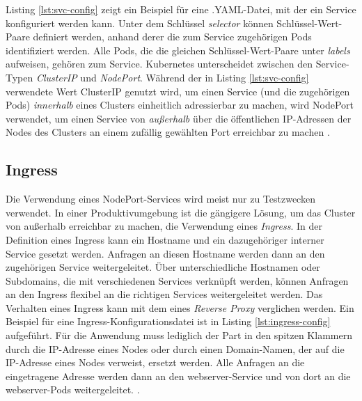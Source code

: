 \documentclass[11pt,a4paper]{article}
\begin{document}
Listing \ref{lst:svc-config} zeigt ein Beispiel für eine .YAML-Datei,
mit der ein Service konfiguriert werden kann.
Unter dem Schlüssel \emph{selector} können Schlüssel-Wert-Paare definiert werden,
anhand derer die zum Service zugehörigen Pods identifiziert werden. Alle Pods, die
die gleichen Schlüssel-Wert-Paare unter \emph{labels} aufweisen, gehören zum Service.
Kubernetes unterscheidet zwischen den Service-Typen \emph{ClusterIP} und \emph{NodePort}.
Während der in Listing \ref{lst:svc-config} verwendete Wert ClusterIP genutzt wird, um einen Service
(und die zugehörigen Pods) \emph{innerhalb} eines Clusters
einheitlich adressierbar zu machen, wird NodePort verwendet, um einen Service von \emph{außerhalb}
über die öffentlichen IP-Adressen der Nodes des Clusters an einem zufällig gewählten Port erreichbar zu machen \cite{Schmeling_Dargatz_2022}.


\subsection{Ingress}
\label{sec:Ingress}
Die Verwendung eines NodePort-Services wird meist nur zu Testzwecken verwendet. In einer Produktivumgebung
ist die gängigere Lösung, um das Cluster von außerhalb erreichbar zu machen, die Verwendung eines \emph{Ingress}.
In der Definition eines Ingress kann ein Hostname und ein dazugehöriger interner Service gesetzt werden.
Anfragen an diesen Hostname werden dann an den zugehörigen Service weitergeleitet. Über unterschiedliche Hostnamen
oder Subdomains, die mit verschiedenen Services verknüpft werden, können Anfragen an den Ingress flexibel
an die richtigen Services weitergeleitet werden. Das Verhalten eines Ingress kann mit dem eines \emph{Reverse Proxy} \cite{nginx}
verglichen werden.
Ein Beispiel für eine Ingress-Konfigurationsdatei ist in Listing \ref{lst:ingress-config} aufgeführt.
Für die Anwendung muss lediglich der Part in den spitzen Klammern durch die IP-Adresse eines Nodes
oder durch einen Domain-Namen, der auf die IP-Adresse eines Nodes verweist, ersetzt werden.
Alle Anfragen an die eingetragene Adresse werden dann an den webserver-Service
und von dort an die webserver-Pods weitergeleitet. \cite{Schmeling_Dargatz_2022}.

\end{document}
